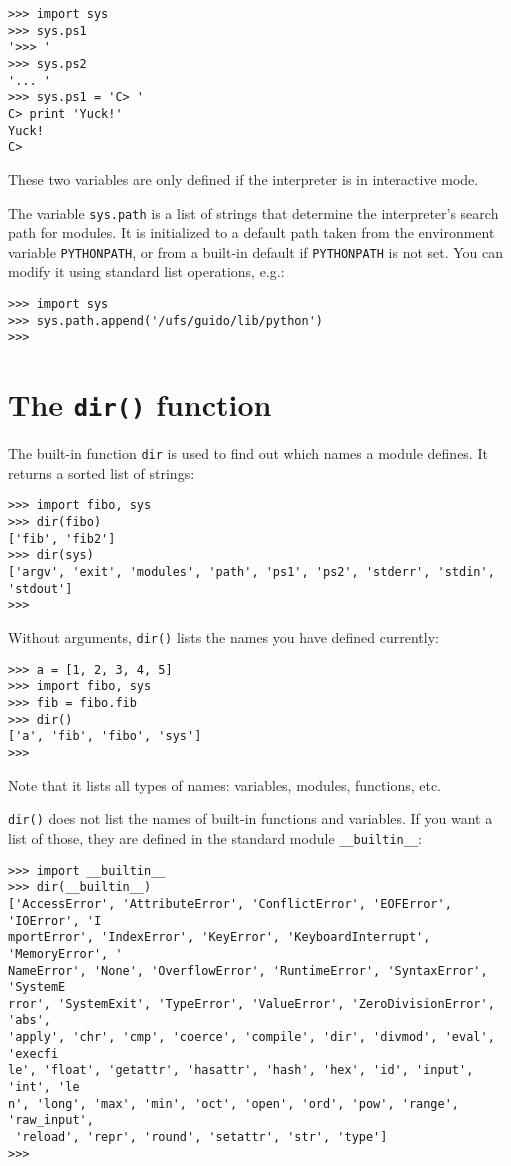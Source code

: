 \bcode\begin{verbatim}
>>> import sys
>>> sys.ps1
'>>> '
>>> sys.ps2
'... '
>>> sys.ps1 = 'C> '
C> print 'Yuck!'
Yuck!
C> 
\end{verbatim}\ecode
%
These two variables are only defined if the interpreter is in
interactive mode.

The variable
{\tt sys.path}
is a list of strings that determine the interpreter's search path for
modules.
It is initialized to a default path taken from the environment variable
{\tt PYTHONPATH},
or from a built-in default if
{\tt PYTHONPATH}
is not set.
You can modify it using standard list operations, e.g.:

\bcode\begin{verbatim}
>>> import sys
>>> sys.path.append('/ufs/guido/lib/python')
>>> 
\end{verbatim}\ecode

\section{The {\tt dir()} function}

The built-in function {\tt dir} is used to find out which names a module
defines.  It returns a sorted list of strings:

\bcode\begin{verbatim}
>>> import fibo, sys
>>> dir(fibo)
['fib', 'fib2']
>>> dir(sys)
['argv', 'exit', 'modules', 'path', 'ps1', 'ps2', 'stderr', 'stdin', 'stdout']
>>>
\end{verbatim}\ecode
%
Without arguments, {\tt dir()} lists the names you have defined currently:

\bcode\begin{verbatim}
>>> a = [1, 2, 3, 4, 5]
>>> import fibo, sys
>>> fib = fibo.fib
>>> dir()
['a', 'fib', 'fibo', 'sys']
>>>
\end{verbatim}\ecode
%
Note that it lists all types of names: variables, modules, functions, etc.

{\tt dir()} does not list the names of built-in functions and variables.
If you want a list of those, they are defined in the standard module
{\tt __builtin__}:

\bcode\begin{verbatim}
>>> import __builtin__
>>> dir(__builtin__)
['AccessError', 'AttributeError', 'ConflictError', 'EOFError', 'IOError', 'I
mportError', 'IndexError', 'KeyError', 'KeyboardInterrupt', 'MemoryError', '
NameError', 'None', 'OverflowError', 'RuntimeError', 'SyntaxError', 'SystemE
rror', 'SystemExit', 'TypeError', 'ValueError', 'ZeroDivisionError', 'abs', 
'apply', 'chr', 'cmp', 'coerce', 'compile', 'dir', 'divmod', 'eval', 'execfi
le', 'float', 'getattr', 'hasattr', 'hash', 'hex', 'id', 'input', 'int', 'le
n', 'long', 'max', 'min', 'oct', 'open', 'ord', 'pow', 'range', 'raw_input',
 'reload', 'repr', 'round', 'setattr', 'str', 'type']
>>>
\end{verbatim}\ecode


